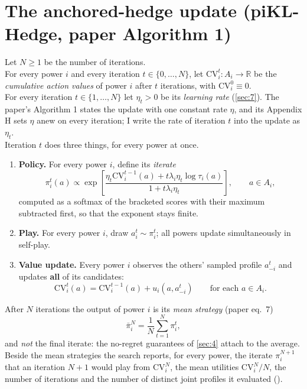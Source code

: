 \documentclass[12pt,a4paper]{article}
\begin{document}
\section{The anchored-hedge update (piKL-Hedge, paper Algorithm 1)}\label{sec:3}

Let $N \ge 1$ be the number of iterations.\\
For every power $i$ and every iteration $t \in \{0, \dots, N\}$, let $\mathrm{CV}_i^{t}\colon A_i \to \mathbb{R}$ be the \emph{cumulative action values} of power $i$ after $t$ iterations, with $\mathrm{CV}_i^{0} \equiv 0$.\\
For every iteration $t \in \{1, \dots, N\}$ let $\eta_t > 0$ be its \emph{learning rate} (\cref{sec:7}).
The paper's Algorithm 1 states the update with one constant rate $\eta$, and its Appendix H sets $\eta$ anew on every iteration; I write the rate of iteration $t$ into the update as $\eta_t$.\\
Iteration $t$ does three things, for every power at once.
\begin{enumerate}
\item \textbf{Policy.} For every power $i$, define its \emph{iterate}
\[
\pi_i^{t}(a) \propto \exp\left[ \frac{\eta_t \mathrm{CV}_i^{t-1}(a) + t \lambda_i \eta_t \log \tau_i(a)}{1 + t \lambda_i \eta_t} \right], \qquad a \in A_i,
\]
computed as a softmax of the bracketed scores with their maximum subtracted first, so that the exponent stays finite.
\item \textbf{Play.} For every power $i$, draw $a_i^{t} \sim \pi_i^{t}$; all powers update simultaneously in self-play.
\item \textbf{Value update.} Every power $i$ observes the others' sampled profile $a_{-i}^{t}$ and updates \textbf{all} of its candidates:
\[
\mathrm{CV}_i^{t}(a) = \mathrm{CV}_i^{t-1}(a) + u_i(a, a_{-i}^{t}) \qquad \text{for each } a \in A_i.
\]
\end{enumerate}
After $N$ iterations the output of power $i$ is its \emph{mean strategy} (paper eq.~7)
\[
\bar{\pi}_i^{N} = \frac{1}{N} \sum_{t=1}^{N} \pi_i^{t},
\]
and \emph{not} the final iterate: the no-regret guarantees of \cref{sec:4} attach to the average.
Beside the mean strategies the search reports, for every power, the iterate $\pi_i^{N+1}$ that an iteration $N + 1$ would play from $\mathrm{CV}_i^{N}$, the mean utilities $\mathrm{CV}_i^{N} / N$, the number of iterations and the number of distinct joint profiles it evaluated ().
\end{document}
